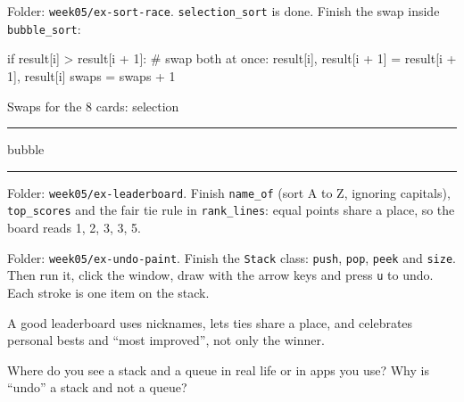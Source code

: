 \begin{exercise}
Folder: \texttt{week05/ex-sort-race}. \texttt{selection\_sort} is done. Finish the swap inside \texttt{bubble\_sort}:
\begin{pycode}
if result[i] > result[i + 1]:
    # swap both at once:
    result[i], result[i + 1] = result[i + 1], result[i]
    swaps = swaps + 1
\end{pycode}
Swaps for the 8 cards: selection \rule{1.5cm}{0.4pt}\quad bubble \rule{1.5cm}{0.4pt}
\end{exercise}

\begin{exercise}[Leaderboard]
Folder: \texttt{week05/ex-leaderboard}. Finish \texttt{name\_of} (sort A to Z, ignoring capitals), \texttt{top\_scores} and the fair tie rule in \texttt{rank\_lines}: equal points share a place, so the board reads 1, 2, 3, 3, 5.
\end{exercise}

\begin{exercise}
Folder: \texttt{week05/ex-undo-paint}. Finish the \texttt{Stack} class: \texttt{push}, \texttt{pop}, \texttt{peek} and \texttt{size}. Then run it, click the window, draw with the arrow keys and press \texttt{u} to undo. Each stroke is one item on the stack.
\end{exercise}

\begin{tip}
A good leaderboard uses nicknames, lets ties share a place, and celebrates personal bests and \enquote{most improved}, not only the winner.
\end{tip}

\begin{vocab}
\end{vocab}

\begin{reflection}
Where do you see a stack and a queue in real life or in apps you use?
Why is \enquote{undo} a stack and not a queue?
\end{reflection}
